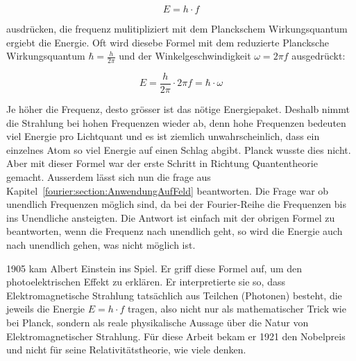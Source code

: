 	\begin{equation}
		E = h \cdot f
	\end{equation}
	
	 ausdrücken, die frequenz mulitipliziert mit dem Planckschem Wirkungsquantum ergiebt die Energie.
	 Oft wird diesebe Formel mit dem reduzierte Plancksche Wirkungsquantum $\hbar = \frac{h}{2\pi}$ und der Winkelgeschwindigkeit $\omega = 2 \pi f$ ausgedrückt:
	 
	 \begin{equation}
		E = \frac{h}{2\pi} \cdot 2\pi f = \hbar \cdot \omega
	 \end{equation}
	 
	 
	Je höher die Frequenz, desto grösser ist das nötige Energiepaket. 
	Deshalb nimmt die Strahlung bei hohen Frequenzen wieder ab, denn hohe Frequenzen bedeuten viel Energie pro Lichtquant und es ist ziemlich unwahrscheinlich, dass ein einzelnes Atom so viel Energie auf einen Schlag abgibt. 
	Planck wusste dies nicht. 
	Aber mit dieser Formel war der erste Schritt in Richtung Quantentheorie gemacht.
	Ausserdem lässt sich nun die frage aus Kapitel~\ref{fourier:section:AnwendungAufFeld} beantworten. 
	Die Frage war ob unendlich Frequenzen möglich sind, da bei der Fourier-Reihe die Frequenzen bis ins Unendliche ansteigten. 
	Die Antwort ist einfach mit der obrigen Formel zu beantworten, wenn die Frequenz nach unendlich geht, so wird die Energie auch nach unendlich gehen, was nicht möglich ist.

	
	
	
	1905 kam Albert Einstein ins Spiel. 
	Er griff diese Formel auf, um den photoelektrischen Effekt zu erklären. 
	Er interpretierte sie so, dass Elektromagnetische Strahlung tatsächlich aus Teilchen (Photonen) besteht, die jeweils die Energie $E = h \cdot f$ tragen, also nicht nur als mathematischer Trick wie bei Planck, sondern als reale physikalische Aussage über die Natur von Elektromagnetischer Strahlung.
	Für diese Arbeit bekam er 1921 den Nobelpreis und nicht für seine Relativitätstheorie, wie viele denken.
	
	 
	
	

